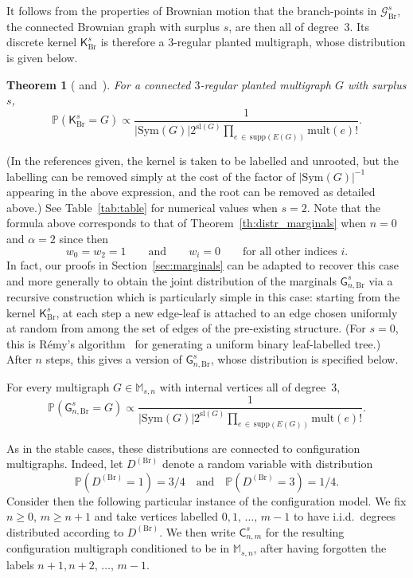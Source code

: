 \documentclass[10pt]{amsart}
\newtheorem{theo}{Theorem}[section]
\theoremstyle{definition}\newtheorem{defi}[theo]{Definition}\newtheorem{rema}[theo]{Remark}\newtheorem{exam}[theo]{Example}\newtheorem{exem}[theo]{Example}\newtheorem{nota}[theo]{Notation}
\newcommand{\abs}[1]{\left\lvert#1\right\rvert}
\newcommand{\Pp}[1]{\mathbb{P} \left(#1\right)}
\newcommand{\supp}{\mathrm{supp}}
\newcommand{\Br}{\mathrm{Br}}
\newcommand{\sll}{\mathrm{sl}}
\newcommand{\Sym}{\mathrm{Sym}}
\newcommand{\mult}{\mathrm{mult}}
\newcommand{\cG}{\mathcal{G}}
\newcommand{\sG}{\mathsf{G}}
\newcommand{\sK}{\mathsf{K}}
\newcommand{\sC}{\mathsf{C}}
\newcommand{\M}{\mathbb{M}}
\newcommand{\bbP}{\mathbb{P}}
\begin{document}
It follows from the properties of Brownian motion that the branch-points in $\cG_{\Br}^s$, the connected Brownian graph with surplus $s$, are then all of degree~3. Its discrete kernel $\sK_{\Br}^s$ is therefore a $3$-regular planted multigraph, whose distribution is given below.

\begin{theo}[{\cite[Figure~(2)]{ABBrGo} and~\cite[Theorem~7]{JKLP93}}]\label{th:distr_brow_ker}
For a connected $3$-regular planted multigraph $G$ with surplus $s$,
\[
\Pp{\sK_{\Br}^s=G}\propto\frac{1}{\abs{\Sym(G)}2^{\sll(G)}\prod\limits_{e\,\in\,\supp(E(G))}\mult(e)!}.
\]
\end{theo}

(In the references given, the kernel is taken to be labelled and unrooted, but the labelling can be removed simply at the cost of the factor of $|\Sym(G)|^{-1}$ appearing in the above expression, and the root can be removed as detailed above.) See Table~\ref{tab:table} for numerical values when $s=2$. Note that the formula above corresponds to that of Theorem~\ref{th:distr_marginals} when $n=0$ and $\alpha=2$ since then
\[
w_0=w_2=1 \qquad \text{and} \qquad w_i=0 \qquad \text{for all other indices } i.
\]
In fact, our proofs in Section~\ref{sec:marginals} can be adapted to recover this case and more generally to obtain the joint distribution of the marginals $\sG_{n,\Br}^s$ via a recursive construction which is particularly simple in this case: starting from the kernel $\sK_{\Br}^s$, at each step a new edge-leaf is attached to an edge chosen uniformly at random from among the set of edges of the pre-existing structure. (For $s=0$, this is Rémy's algorithm~\cite{Remy} for generating a uniform binary leaf-labelled tree.) After $n$ steps, this gives a version of $\sG_{n,\Br}^s$, whose distribution is specified below.

\begin{prop}\label{th:distr_brow_mar}
For every multigraph $G \in \M_{s,n}$ with internal vertices all of degree~3,
\[
\Pp{\sG_{n,{\Br}}^s=G}\propto\frac{1}{\abs{\Sym(G)}2^{\sll(G)}\prod\limits_{e\,\in\,\supp(E(G))}\mult(e)!}.
\]
\end{prop}

As in the stable cases, these distributions are connected to configuration multigraphs. Indeed, let $D^{(\Br)}$ denote a random variable with distribution
\[
\bbP\left(D^{({\Br})}=1\right)=3/4 \quad \text{and} \quad \bbP\left(D^{(\Br)}=3\right)=1/4.
\]
Consider then the following particular instance of the configuration model. We fix $n \ge 0$, $m \ge n+1$ and take vertices labelled $0, 1,\,\ldots,\,m-1$ to have i.i.d.\ degrees distributed according to $D^{(\Br)}$. We then write $\sC_{n,m}^s$ for the resulting configuration multigraph conditioned to be in $\M_{s,n}$, after having forgotten the labels $n+1, n+2,\,\ldots,\,m-1$.
\end{document}
